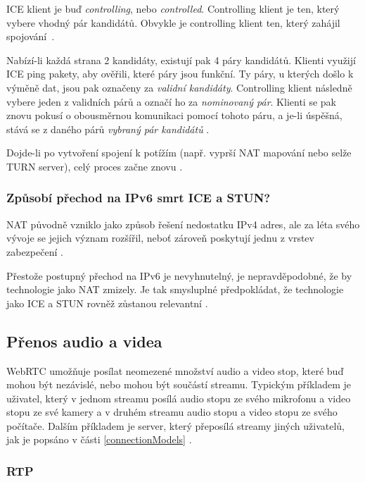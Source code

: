 ICE klient je buď \textit{controlling}, nebo \textit{controlled}. Controlling
klient je ten, který vybere vhodný pár kandidátů. Obvykle je controlling klient
ten, který zahájil spojování~\cite{WebRTCForTheCurious}.

Nabízí-li každá strana 2 kandidáty, existují pak 4 páry kandidátů. Klienti
využijí ICE ping pakety, aby ověřili, které páry jsou funkční. Ty páry, u
kterých došlo k výměně dat, jsou pak označeny za \textit{validní kandidáty}.
Controlling klient následně vybere jeden z validních párů a označí ho za
\textit{nominovaný pár}. Klienti se pak znovu pokusí o obousměrnou komunikaci
pomocí tohoto páru, a je-li úspěšná, stává se z daného párů \textit{vybraný pár
	kandidátů} \cite{WebRTCForTheCurious}.

Dojde-li po vytvoření spojení k potížím (např. vyprší NAT mapování nebo selže
TURN server), celý proces začne znovu \cite{WebRTCForTheCurious}.

\subsubsection{Způsobí přechod na IPv6 smrt ICE a STUN?}

NAT původně vzniklo jako způsob řešení nedostatku IPv4 adres, ale za léta svého
vývoje se jejich význam rozšířil, neboť zároveň poskytují jednu z vrstev
zabezpečení \cite{Quora-WillIPv6KillSTUNAndICE}.

Přestože postupný přechod na IPv6 je nevyhnutelný, je nepravděpodobné, že by
technologie jako NAT zmizely. Je tak smysluplné předpokládat, že technologie
jako ICE a STUN rovněž zůstanou relevantní \cite{Quora-WillIPv6KillSTUNAndICE}.

\subsection{Přenos audio a videa}

WebRTC umožňuje posílat neomezené množství audio a video stop, které buď mohou
být nezávislé, nebo mohou být součástí streamu. Typickým příkladem je uživatel,
který v jednom streamu posílá audio stopu ze svého mikrofonu a video stopu ze
své kamery a v druhém streamu audio stopu a video stopu ze svého počítače.
Dalším příkladem je server, který přeposílá streamy jiných uživatelů, jak je
popsáno v části \ref{connectionModels} \cite{WebRTCForTheCurious}.

\subsubsection{RTP}\label{rtp}

